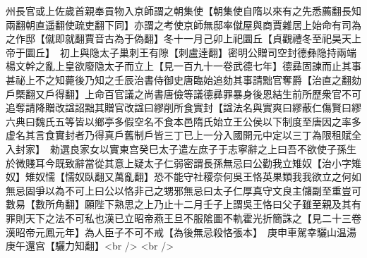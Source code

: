 州長官或上佐歲首親奉貢物入京師謂之朝集使【朝集使自隋以來有之先悉薦翻長知兩翻朝直遥翻使疏吏翻下同】亦謂之考使京師無邸率僦屋與商賈雜居上始命有司為之作邸【僦即就翻賈音古為于偽翻】冬十一月己卯上祀圜丘【貞觀禮冬至祀昊天上帝于圜丘】　初上與隐太子巢刺王有隙【刺盧逹翻】密明公贈司空封德彝隐持兩端楊文幹之亂上皇欲廢隐太子而立上【見一百九十一卷武德七年】德彞固諫而止其事甚祕上不之知薨後乃知之壬辰治書侍御史唐臨始追劾其事請黜官奪爵【治直之翻劾戶槩翻又戶得翻】上命百官議之尚書唐儉等議德彞罪暴身後恩結生前所歷衆官不可追奪請降贈改諡詔黜其贈官改諡曰繆削所食實封【諡法名與實爽曰繆蔽仁傷賢曰繆六典曰魏氏五等皆以鄉亭多假空名不食本邑隋氏始立王公侯以下制度至唐因之率多虚名其言食實封者乃得真戶舊制戶皆三丁已上一分入國開元中定以三丁為限租賦全入封家】　勑選良家女以實東宫癸巳太子遣左庶子于志寧辭之上曰吾不欲使子孫生於微賤耳今既致辭當從其意上疑太子仁弱密謂長孫無忌曰公勸我立雉奴【治小字雉奴】雉奴懦【懦奴臥翻又萬亂翻】恐不能守社稷奈何吳王恪英果類我我欲立之何如無忌固爭以為不可上曰公以恪非己之甥邪無忌曰太子仁厚真守文良主儲副至重豈可數易【數所角翻】願陛下熟思之上乃止十二月壬子上謂吳王恪曰父子雖至親及其有罪則天下之法不可私也漢已立昭帝燕王旦不服隂圖不軌霍光折簡誅之【見二十三卷漢昭帝元鳳元年】為人臣子不可不戒【為後無忌殺恪張本】　庚申車駕幸驪山温湯庚午還宫【驪力知翻】<br />
<br />
